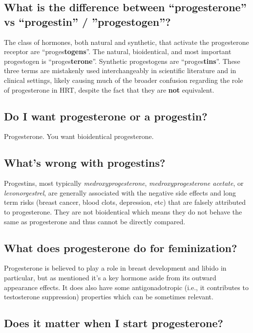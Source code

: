 \documentclass{article}
\begin{document}
\subsection{What is the difference between “progesterone” vs “progestin” / ”progestogen”?}

The class of hormones, both natural and synthetic, that activate the progesterone receptor are “proges\textbf{togens}”. The natural, bioidentical, and most important progestogen is “proges\textbf{terone}”. Synthetic progestogens are “proges\textbf{tins}”. These three terms are mistakenly used interchangeably in scientific literature and in clinical settings, likely causing much of the broader confusion regarding the role of progesterone in HRT, despite the fact that they are \textbf{not} equivalent.

\subsection{Do I want progesterone or a progestin?}

Progesterone. You want bioidentical progesterone.

\subsection{What’s wrong with progestins?}

Progestins, most typically \textit{medroxyprogesterone}, \textit{medroxyprogesterone acetate}, or \textit{levonorgestrel}, are generally associated with the negative side effects and long term risks (breast cancer, blood clots, depression, etc) that are falsely attributed to progesterone. They are not bioidentical which means they do not behave the same as progesterone and thus cannot be directly compared.

\subsection{What does progesterone do for feminization?}

Progesterone is believed to play a role in breast development and libido in particular, but as mentioned it’s a key hormone aside from its outward appearance effects. It does also have some antigonadotropic (i.e., it contributes to testosterone suppression) properties which can be sometimes relevant.

\subsection{Does it matter when I start progesterone?}
\end{document}
